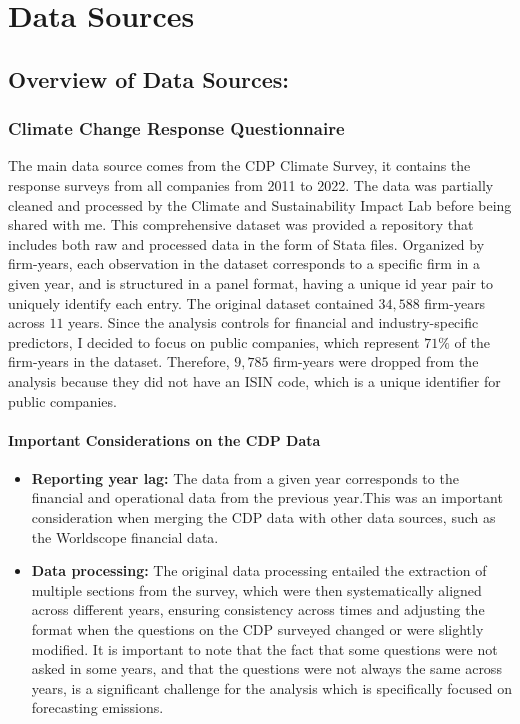 \chapter{Data Sources}

\section{Overview of Data Sources:}

\subsection{Climate Change Response Questionnaire}
The main data source comes from the CDP Climate Survey, it contains the response surveys from all companies from 2011 to 2022. The data was partially cleaned and processed by the Climate and Sustainability Impact Lab \cite{HarvardD3Lab2024} before being shared with me. This comprehensive dataset was provided a repository that includes both raw and processed data in the form of Stata files. Organized by firm-years, each observation in the dataset corresponds to a specific firm in a given year, and is structured in a panel format, having a unique id year pair to uniquely identify each entry. The original dataset contained $34,588$ firm-years across $11$ years. Since the analysis controls for financial and industry-specific predictors, I decided to focus on public companies, which represent $71\%$ of the firm-years in the dataset. Therefore, $9,785$ firm-years were dropped from the analysis because they did not have an ISIN code, which is a unique identifier for public companies. 

\subsubsection{Important Considerations on the CDP Data}
\begin{itemize}
    \item \textbf{Reporting year lag:} The data from a given year corresponds to the financial and operational data from the previous year.This was an important consideration when merging the CDP data with other data sources, such as the Worldscope financial data.
    \item \textbf{Data processing:} The original data processing entailed the extraction of multiple sections from the survey, which were then systematically aligned across different years, ensuring consistency across times and adjusting the format when the questions on the CDP surveyed changed or were slightly modified. It is important to note that the fact that some questions were not asked in some years, and that the questions were not always the same across years, is a significant challenge for the analysis which is specifically focused on forecasting emissions.

\end{itemize}


